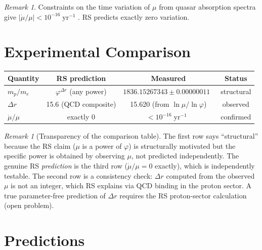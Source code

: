 \documentclass[12pt,a4paper]{article}
\theoremstyle{definition}
\theoremstyle{remark}
\newtheorem{remark}[theorem]{Remark}
\begin{document}
\begin{remark}
Constraints on the time variation of $\mu$ from quasar absorption
spectra give $|\dot{\mu}/\mu| < 10^{-16}\;\mathrm{yr}^{-1}$
\cite{Ubachs2015}.  RS predicts exactly zero variation.
\end{remark}

\section{Experimental Comparison}
\label{sec:comparison}

\begin{center}
\renewcommand{\arraystretch}{1.3}
\begin{tabular}{lccc}
\toprule
\textbf{Quantity} & \textbf{RS prediction} & \textbf{Measured} & \textbf{Status} \\
\midrule
$m_p/m_e$ & $\varphi^{\Delta r}$ (any power) &
$1836.15267343 \pm 0.00000011$~\cite{CODATA2022} & structural \\
$\Delta r$ & 15.6 (QCD composite) & 15.620 (from $\ln\mu/\ln\varphi$) & observed \\
$\dot{\mu}/\mu$ & exactly 0 & $< 10^{-16}\;\mathrm{yr}^{-1}$~\cite{Ubachs2015} & confirmed \\
\bottomrule
\end{tabular}
\end{center}

\begin{remark}[Transparency of the comparison table]
The first row says ``structural'' because the RS claim ($\mu$ is a power
of $\varphi$) is structurally motivated but the specific power is
obtained by observing $\mu$, not predicted independently.  The genuine
RS \emph{prediction} is the third row ($\dot{\mu}/\mu = 0$ exactly),
which is independently testable.  The second row is a consistency
check: $\Delta r$ computed from the observed $\mu$ is not an integer,
which RS explains via QCD binding in the proton sector.  A true
parameter-free prediction of $\Delta r$ requires the RS proton-sector
calculation (open problem).
\end{remark}

\section{Predictions}
\label{sec:predictions}
\end{document}
